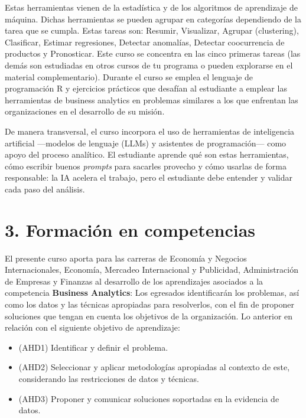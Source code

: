 \documentclass[11pt,a4paper]{article}
\begin{document}
Estas herramientas vienen de la estadística y de los algoritmos de aprendizaje de máquina. Dichas herramientas se pueden agrupar en categorías dependiendo de la tarea que se cumpla. Estas tareas son: Resumir, Visualizar, Agrupar (clustering), Clasificar, Estimar regresiones, Detectar anomalías, Detectar coocurrencia de productos y Pronosticar. Este curso se concentra en las cinco primeras tareas (las demás son estudiadas en otros cursos de tu programa o pueden explorarse en el material complementario). Durante el curso se emplea el lenguaje de programación R y ejercicios prácticos que desafían al estudiante a emplear las herramientas de business analytics en problemas similares a los que enfrentan las organizaciones en el desarrollo de su misión.

\vspace{0.3cm}

De manera transversal, el curso incorpora el uso de herramientas de inteligencia artificial ---modelos de lenguaje (LLMs) y asistentes de programación--- como apoyo del proceso analítico. El estudiante aprende qué son estas herramientas, cómo escribir buenos \textit{prompts} para sacarles provecho y cómo usarlas de forma responsable: la IA acelera el trabajo, pero el estudiante debe entender y validar cada paso del análisis.

\section*{3. Formación en competencias}

El presente curso aporta para las carreras de Economía y Negocios Internacionales, Economía, Mercadeo Internacional y Publicidad, Administración de Empresas y Finanzas al desarrollo de los aprendizajes asociados a la competencia \textbf{Business Analytics}: Los egresados identificarán los problemas, así como los datos y las técnicas apropiadas para resolverlos, con el fin de proponer soluciones que tengan en cuenta los objetivos de la organización. Lo anterior en relación con el siguiente objetivo de aprendizaje:

\begin{itemize}
    \item (AHD1) Identificar y definir el problema.
    \item (AHD2) Seleccionar y aplicar metodologías apropiadas al contexto de este, considerando las restricciones de datos y técnicas.
    \item (AHD3) Proponer y comunicar soluciones soportadas en la evidencia de datos.
\end{itemize}
\end{document}
